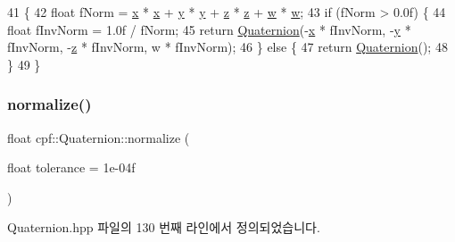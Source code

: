 \begin{DoxyCode}
41                                          \{
42         \textcolor{keywordtype}{float} fNorm = \hyperlink{classcpf_1_1_quaternion_a200f7bce4e673281af8cc7dd75cb0677}{x} * \hyperlink{classcpf_1_1_quaternion_a200f7bce4e673281af8cc7dd75cb0677}{x} + \hyperlink{classcpf_1_1_quaternion_a4fbade6e58be55a49c94e7f157988136}{y} * \hyperlink{classcpf_1_1_quaternion_a4fbade6e58be55a49c94e7f157988136}{y} + \hyperlink{classcpf_1_1_quaternion_ade9c41b717605118e5fdf95d96a843b4}{z} * \hyperlink{classcpf_1_1_quaternion_ade9c41b717605118e5fdf95d96a843b4}{z} + \hyperlink{classcpf_1_1_quaternion_af312a196b39bb4903b876bc454ac15f8}{w} * \hyperlink{classcpf_1_1_quaternion_af312a196b39bb4903b876bc454ac15f8}{w};
43         \textcolor{keywordflow}{if} (fNorm > 0.0f) \{
44             \textcolor{keywordtype}{float} fInvNorm = 1.0f / fNorm;
45             \textcolor{keywordflow}{return} \hyperlink{classcpf_1_1_quaternion_aae3cc98fcdb7a419a29db4ee988972bc}{Quaternion}(-\hyperlink{classcpf_1_1_quaternion_a200f7bce4e673281af8cc7dd75cb0677}{x} * fInvNorm, -\hyperlink{classcpf_1_1_quaternion_a4fbade6e58be55a49c94e7f157988136}{y} * fInvNorm, -\hyperlink{classcpf_1_1_quaternion_ade9c41b717605118e5fdf95d96a843b4}{z} * fInvNorm, w * fInvNorm);
46         \} \textcolor{keywordflow}{else} \{
47             \textcolor{keywordflow}{return} \hyperlink{classcpf_1_1_quaternion_aae3cc98fcdb7a419a29db4ee988972bc}{Quaternion}();
48         \}
49     \}
\end{DoxyCode}
\mbox{\label{classcpf_1_1_quaternion_aa49b8cb06b215e91f36fb2ec0d8741ed}} 
\subsubsection{\texorpdfstring{normalize()}{normalize()}}
{\footnotesize\ttfamily float cpf\+::\+Quaternion\+::normalize (\begin{DoxyParamCaption}\item[{float}]{tolerance = {\ttfamily 1e-\/04f} }\end{DoxyParamCaption})\hspace{0.3cm}{\ttfamily [inline]}}



Quaternion.\+hpp 파일의 130 번째 라인에서 정의되었습니다.



